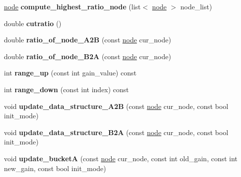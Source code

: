 \begin{DoxyCompactItemize}
\mbox{\label{classratio__cut__partition_a24a11a8c3a090c0022583108b9e08c07}} 
\mbox{\hyperlink{classnode}{node}} {\bfseries compute\+\_\+highest\+\_\+ratio\+\_\+node} (list$<$ \mbox{\hyperlink{classnode}{node}} $>$ node\+\_\+list)
\item 
\mbox{\label{classratio__cut__partition_a0adcba3c7847fcb62b607eebc334c503}} 
double {\bfseries cutratio} ()
\item 
\mbox{\label{classratio__cut__partition_add7d355bd4df2cf6fa77ddc791692c88}} 
double {\bfseries ratio\+\_\+of\+\_\+node\+\_\+\+A2B} (const \mbox{\hyperlink{classnode}{node}} cur\+\_\+node)
\item 
\mbox{\label{classratio__cut__partition_a094de379f453978db56695d53f6bc536}} 
double {\bfseries ratio\+\_\+of\+\_\+node\+\_\+\+B2A} (const \mbox{\hyperlink{classnode}{node}} cur\+\_\+node)
\item 
\mbox{\label{classratio__cut__partition_a5cda26b908793b59881798d88b07344c}} 
int {\bfseries range\+\_\+up} (const int gain\+\_\+value) const
\item 
\mbox{\label{classratio__cut__partition_a3933d3829218a58cfc8eef84981034a8}} 
int {\bfseries range\+\_\+down} (const int index) const
\item 
\mbox{\label{classratio__cut__partition_acdb4b69b6c94f06f6997ccec296a281f}} 
void {\bfseries update\+\_\+data\+\_\+structure\+\_\+\+A2B} (const \mbox{\hyperlink{classnode}{node}} cur\+\_\+node, const bool init\+\_\+mode)
\item 
\mbox{\label{classratio__cut__partition_a942a3a035f59f2ab0d1d62da3c878eb8}} 
void {\bfseries update\+\_\+data\+\_\+structure\+\_\+\+B2A} (const \mbox{\hyperlink{classnode}{node}} cur\+\_\+node, const bool init\+\_\+mode)
\item 
\mbox{\label{classratio__cut__partition_acbd0608a7e5560a52c447711cb59a644}} 
void {\bfseries update\+\_\+bucketA} (const \mbox{\hyperlink{classnode}{node}} cur\+\_\+node, const int old\+\_\+gain, const int new\+\_\+gain, const bool init\+\_\+mode)

\end{DoxyCompactItemize}
